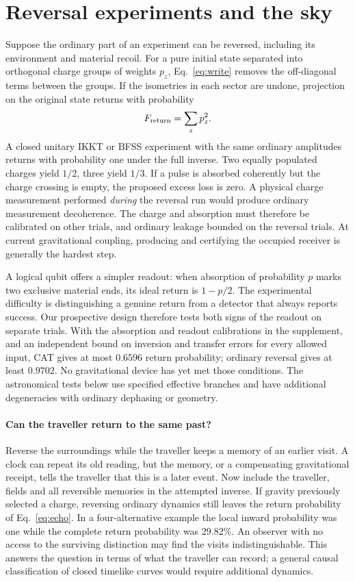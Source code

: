 \section{Reversal experiments and the sky}\label{sec:tests}
Suppose the ordinary part of an experiment can be reversed, including its environment and material recoil. For a pure initial state separated into orthogonal charge groups of weights \(p_z\), Eq.~\eqref{eq:write} removes the off-diagonal terms between the groups. If the isometries in each sector are undone, projection on the original state returns with probability
\begin{equation}
 F_{\rm return}=\sum_z p_z^2 . \label{eq:echo}
\end{equation}
A closed unitary IKKT or BFSS experiment with the same ordinary amplitudes returns with probability one under the full inverse. Two equally populated charges yield \(1/2\), three yield \(1/3\). If a pulse is absorbed coherently but the charge crossing is empty, the proposed excess loss is zero. A physical charge measurement performed \emph{during} the reversal run would produce ordinary measurement decoherence. The charge and absorption must therefore be calibrated on other trials, and ordinary leakage bounded on the reversal trials. At current gravitational coupling, producing and certifying the occupied receiver is generally the hardest step.

A logical qubit offers a simpler readout: when absorption of probability \(p\) marks two exclusive material ends, its ideal return is \(1-p/2\). The experimental difficulty is distinguishing a genuine return from a detector that always reports success. Our prospective design therefore tests both signs of the readout on separate trials. With the absorption and readout calibrations in the supplement, and an independent bound on inversion and transfer errors for every allowed input, CAT gives at most \(0.6596\) return probability; ordinary reversal gives at least \(0.9702\). No gravitational device has yet met those conditions. The astronomical tests below use specified effective branches and have additional degeneracies with ordinary dephasing or geometry.

\paragraph{Can the traveller return to the same past?}\label{par:traveller}
Reverse the surroundings while the traveller keeps a memory of an earlier visit. A clock can repeat its old reading, but the memory, or a compensating gravitational receipt, tells the traveller that this is a later event. Now include the traveller, fields and all reversible memories in the attempted inverse. If gravity previously selected a charge, reversing ordinary dynamics still leaves the return probability of Eq.~\eqref{eq:echo}. In a four-alternative example the local inward probability was one while the complete return probability was \(29.82\%\). An observer with no access to the surviving distinction may find the visits indistinguishable. This answers the question in terms of what the traveller can record; a general causal classification of closed timelike curves would require additional dynamics.

